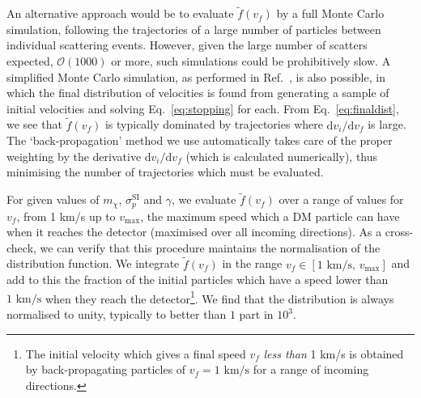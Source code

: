 \documentclass[prd,twocolumn,showpacs,nofootinbib,aps]{revtex4-1}
\begin{document}
An alternative approach would be to evaluate $\tilde{f}(v_f)$ by a full Monte Carlo simulation, following the trajectories of a large number of particles between individual scattering events. However, given the large number of scatters expected, $\mathcal{O}(1000)$ or more, such simulations could be prohibitively slow. A simplified Monte Carlo simulation, as performed in Ref.~\cite{Davis:2017noy}, is also possible, in which the final distribution of velocities is found from generating a sample of initial velocities and solving Eq.~\eqref{eq:stopping} for each. From Eq.~\eqref{eq:finaldist}, we see that $\tilde{f}(v_f)$ is typically dominated by trajectories where $\mathrm{d}v_i/\mathrm{d}v_f$ is large. The `back-propagation' method we use automatically takes care of the proper weighting by the derivative $\mathrm{d}v_i/\mathrm{d}v_f$ (which is calculated numerically), thus minimising the number of trajectories which must be evaluated. 


For given values of $m_\chi$, $\sigma_p^\mathrm{SI}$ and $\gamma$, we evaluate $\tilde{f}(v_f)$ over a range of values for $v_f$, from 1 km/s up to $v_\mathrm{max}$, the maximum speed which a DM particle can have when it reaches the detector (maximised over all incoming directions). As a cross-check, we can verify that this procedure maintains the normalisation of the distribution function. We integrate $\tilde{f}(v_f)$ in the range $v_f \in [1 \,\,\mathrm{km/s}, \,v_\mathrm{max}]$ and add to this the fraction of the initial particles which have a speed lower than $1 \,\,\mathrm{km/s}$ when they reach the detector\footnote{The initial velocity which gives a final speed $v_f$ \textit{less than} 1 km/s is obtained by back-propagating particles of $v_f = 1\,\,\mathrm{km/s}$ for a range of incoming directions.}. We find that the distribution is always normalised to unity, typically to better than $1$ part in $10^3$.

\end{document}
